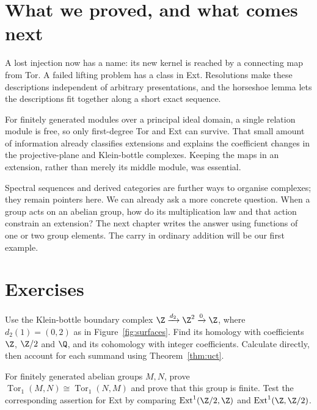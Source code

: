 \section{What we proved, and what comes next}

A lost injection now has a name: its new kernel is reached by a connecting map from Tor. A failed lifting problem has a class in Ext. Resolutions make these descriptions independent of arbitrary presentations, and the horseshoe lemma lets the descriptions fit together along a short exact sequence.

For finitely generated modules over a principal ideal domain, a single relation module is free, so only first-degree Tor and Ext can survive. That small amount of information already classifies extensions and explains the coefficient changes in the projective-plane and Klein-bottle complexes. Keeping the maps in an extension, rather than merely its middle module, was essential.

Spectral sequences and derived categories are further ways to organise complexes; they remain pointers here. We can already ask a more concrete question. When a group acts on an abelian group, how do its multiplication law and that action constrain an extension? The next chapter writes the answer using functions of one or two group elements. The carry in ordinary addition will be our first example.

\section{Exercises}

\begin{exercise}[$\star$]\label{ex:kleinuct}
Use the Klein-bottle boundary complex
$\Z\xrightarrow{d_2}\Z^2\xrightarrow{0}\Z$, where $d_2(1)=(0,2)$ as in Figure~\ref{fig:surfaces}. Find its homology with coefficients $\Z$, $\Z/2$ and $\Q$, and its cohomology with integer coefficients. Calculate directly, then account for each summand using Theorem~\ref{thm:uct}.
\end{exercise}

\begin{exercise}[$\star$]\label{ex:torsym}
For finitely generated abelian groups $M,N$, prove
$\operatorname{Tor}_1(M,N)\cong\operatorname{Tor}_1(N,M)$ and prove that this group is finite. Test the corresponding assertion for Ext by comparing
$\operatorname{Ext}^1(\Z/2,\Z)$ and $\operatorname{Ext}^1(\Z,\Z/2)$.
\end{exercise}

